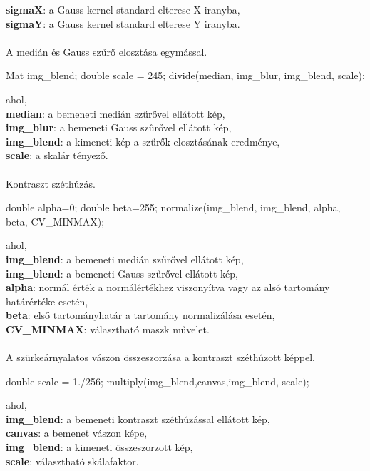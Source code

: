 \indent \textbf{sigmaX}: a Gauss kernel standard elterese X iranyba,\\
\indent \textbf{sigmaY}: a Gauss kernel standard elterese Y iranyba.\\ \\
A medián és Gauss szűrő elosztása egymással.
\begin{cpp}
Mat img_blend;
double scale = 245;
divide(median, img_blur, img_blend, scale);   
\end{cpp}
ahol, \\
\indent \textbf{median}: a bemeneti medián szűrővel ellátott kép,\\
\indent \textbf{img\_blur}: a bemeneti Gauss szűrővel ellátott kép,\\
\indent \textbf{img\_blend}: a kimeneti kép a szűrők elosztásának eredménye,\\
\indent \textbf{scale}: a skalár tényező.\\ \\
Kontraszt széthúzás.
\begin{cpp}
double alpha=0; 
double beta=255;
normalize(img_blend, img_blend, alpha, beta, CV_MINMAX);
\end{cpp}
ahol, \\
\indent \textbf{img\_blend}: a bemeneti medián szűrővel ellátott kép,\\
\indent \textbf{img\_blend}: a bemeneti Gauss szűrővel ellátott kép,\\
\indent \textbf{alpha}: normál érték a normálértékhez viszonyítva vagy az alsó tartomány határértéke esetén,\\
\indent \textbf{beta}: első tartományhatár a tartomány normalizálása esetén,\\
\indent \textbf{CV\_MINMAX}: választható maszk művelet.\\ \\
A szürkeárnyalatos vászon összeszorzása a kontraszt széthúzott képpel.
\begin{cpp}
double scale = 1./256;
multiply(img_blend,canvas,img_blend, scale);
\end{cpp}
ahol, \\
\indent \textbf{img\_blend}: a bemeneti kontraszt széthúzással ellátott kép,\\
\indent \textbf{canvas}: a bemenet vászon képe,\\
\indent \textbf{img\_blend}: a kimeneti összeszorzott kép,\\
\indent \textbf{scale}: választható skálafaktor.\\\\
